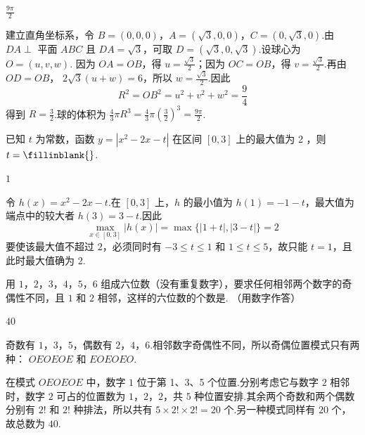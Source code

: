 \begin{answer}
\(\frac{9\pi}{2}\)
\end{answer}

\begin{solution}
建立直角坐标系，令 \(B=(0,0,0)\)，\(A=(\sqrt3,0,0)\)，\(C=(0,\sqrt3,0)\).由
\(DA\perp\) 平面 \(ABC\) 且 \(DA=\sqrt3\)，可取 \(D=(\sqrt3,0,\sqrt3)\).设球心为
\(O=(u,v,w)\).
因为 \(OA=OB\)，得 \(u=\frac{\sqrt3}{2}\)；因为 \(OC=OB\)，得 \(v=\frac{\sqrt3}{2}\).再由 \(OD=OB\)，
\(2\sqrt3(u+w)=6\)，所以 \(w=\frac{\sqrt3}{2}\).因此
\[
R^2=OB^2=u^2+v^2+w^2=\frac94
\]
得到 \(R=\frac32\).球的体积为
\(\frac43\pi R^3=\frac43\pi\left(\frac32\right)^3=\frac{9\pi}{2}\).
\end{solution}

\begin{problem}
已知 \(t\) 为常数，函数 \(y = |x^2 - 2x - t|\) 在区间 \([0,3]\) 上的最大值为 2 ，则 \(t =\fillinblank{}\).
\end{problem}

\begin{answer}
\(1\)
\end{answer}

\begin{solution}
令 \(h(x)=x^2-2x-t\).在 \([0,3]\) 上，\(h\) 的最小值为
\(h(1)=-1-t\)，最大值为端点中的较大者 \(h(3)=3-t\).因此
\[
\max_{x\in[0,3]}|h(x)|=\max\{|1+t|,|3-t|\}=2
\]
要使该最大值不超过 2，必须同时有 \(-3\leqslant t\leqslant1\) 和 \(1\leqslant t\leqslant5\)，故只能 \(t=1\)，且此时最大值确为 2.
\end{solution}

\begin{problem}
用 \(1\)，\(2\)，\(3\)，\(4\)，\(5\)，\(6\) 组成六位数（没有重复数字），要求任何相邻两个数字的奇偶性不同，且 \(1\) 和 \(2\) 相邻，这样的六位数的个数是\fillinblank{}. （用数字作答）
\end{problem}

\begin{answer}
\(40\)
\end{answer}

\begin{solution}
奇数有 \(1\)，\(3\)，\(5\)，偶数有 \(2\)，\(4\)，\(6\).相邻数字奇偶性不同，所以奇偶位置模式只有两种：
\(OEOEOE\) 和 \(EOEOEO\).

在模式 \(OEOEOE\) 中，数字 \(1\) 位于第 1、3、5 个位置.分别考虑它与数字 \(2\) 相邻时，数字 \(2\) 可占的位置数为 \(1\)，\(2\)，\(2\)，共 \(5\) 种位置安排.其余两个奇数和两个偶数分别有 \(2!\) 和 \(2!\) 种排法，所以共有 \(5\times2!\times2!=20\) 个.另一种模式同样有 \(20\) 个，故总数为 \(40\).
\end{solution}

